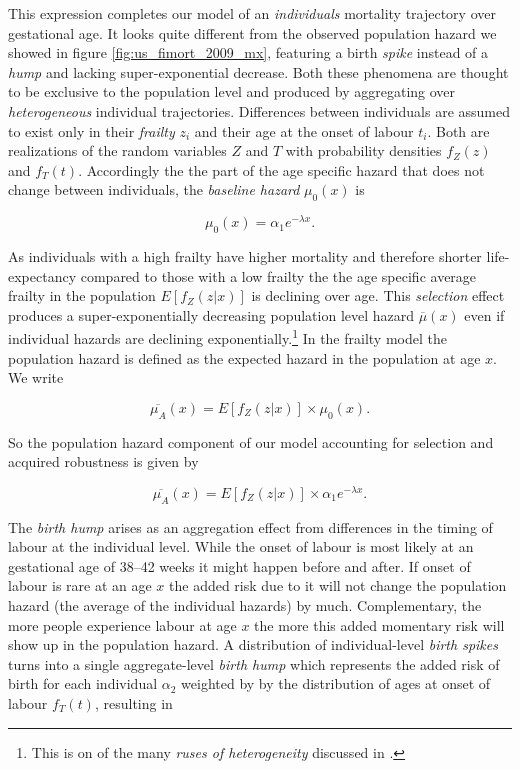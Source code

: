 \documentclass[12pt, parskip=half]{scrartcl}
\begin{document}
This expression completes our model of an \emph{individuals} mortality trajectory over gestational age. It looks quite different from the observed population hazard we showed in figure \ref{fig:us_fimort_2009_mx}, featuring a birth \emph{spike} instead of a \emph{hump} and lacking super-exponential decrease. Both these phenomena are thought to be exclusive to the population level and produced by aggregating over \emph{heterogeneous} individual trajectories. Differences between individuals are assumed to exist only in their \emph{frailty} $z_i$ and their age at the onset of labour $t_i$. Both are realizations of the random variables $Z$ and $T$ with probability densities $f_Z(z)$ and $f_T(t)$. Accordingly the the part of the age specific hazard that does not change between individuals, the \emph{baseline hazard} $\mu_0(x)$ is

\begin{equation}
  \mu_0(x) = \alpha_1 e^{-\lambda x}.
  \label{eq:baselinehzrd}
\end{equation}

As individuals with a high frailty have higher mortality and therefore shorter life-expectancy compared to those with a low frailty the the age specific average frailty in the population $E[f_Z(z|x)]$ is declining over age. This \emph{selection} effect produces a super-exponentially decreasing population level hazard $\overline{\mu}(x)$ even if individual hazards are declining exponentially.\footnote{This is on of the many \emph{ruses of heterogeneity} discussed in \cite{Vaupel1985}.} In the frailty model the population hazard is defined as the expected hazard in the population at age $x$. We write

\begin{equation}
  \overline{\mu_A}(x) = E[f_Z(z|x)] \times \mu_0(x).
  \label{eq:pophzrd_frailty1}
\end{equation}

So the population hazard component of our model accounting for selection and acquired robustness is given by

\begin{equation}
  \overline{\mu_A}(x) = E[f_Z(z|x)] \times \alpha_1 e^{-\lambda x}.
  \label{eq:pophzrd_frailty2}
\end{equation}

The \emph{birth hump} arises as an aggregation effect from differences in the timing of labour at the individual level. While the onset of labour is most likely at an gestational age of 38--42 weeks it might happen before and after. If onset of labour is rare at an age $x$ the added risk due to it will not change the population hazard (the average of the individual hazards) by much. Complementary, the more people experience labour at age $x$ the more this added momentary risk will show up in the population hazard. A distribution of individual-level \emph{birth spikes} turns into a single aggregate-level \emph{birth hump} which represents the added risk of birth for each individual $\alpha_2$ weighted by by the distribution of ages at onset of labour $f_T(t)$, resulting in
\end{document}
